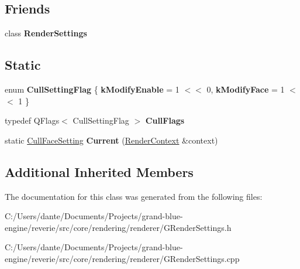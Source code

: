 \subsection*{Friends}
\begin{DoxyCompactItemize}
\item 
\mbox{\label{classrev_1_1_cull_face_setting_abf433a9c39697ef25510a90f4cf565b0}} 
class {\bfseries Render\+Settings}
\end{DoxyCompactItemize}
\subsection*{Static}
\begin{DoxyCompactItemize}
\item 
\mbox{\label{classrev_1_1_cull_face_setting_af97b1aa8a92182ca4239204fb4c4ef9c}} 
enum {\bfseries Cull\+Setting\+Flag} \{ {\bfseries k\+Modify\+Enable} = 1 $<$$<$ 0, 
{\bfseries k\+Modify\+Face} = 1 $<$$<$ 1
 \}
\item 
\mbox{\label{classrev_1_1_cull_face_setting_ae8ee04eb7a0aa82273ebdf4ec83e69d0}} 
typedef Q\+Flags$<$ Cull\+Setting\+Flag $>$ {\bfseries Cull\+Flags}
\item 
\mbox{\label{classrev_1_1_cull_face_setting_a2763437d430230c732e00064bd677a4d}} 
static \mbox{\hyperlink{classrev_1_1_cull_face_setting}{Cull\+Face\+Setting}} {\bfseries Current} (\mbox{\hyperlink{classrev_1_1_render_context}{Render\+Context}} \&context)
\end{DoxyCompactItemize}
\subsection*{Additional Inherited Members}


The documentation for this class was generated from the following files\+:\begin{DoxyCompactItemize}
\item 
C\+:/\+Users/dante/\+Documents/\+Projects/grand-\/blue-\/engine/reverie/src/core/rendering/renderer/G\+Render\+Settings.\+h\item 
C\+:/\+Users/dante/\+Documents/\+Projects/grand-\/blue-\/engine/reverie/src/core/rendering/renderer/G\+Render\+Settings.\+cpp\end{DoxyCompactItemize}
